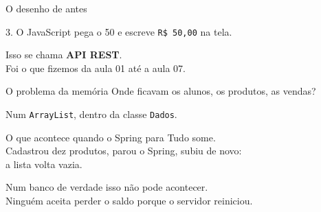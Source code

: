 \documentclass[aspectratio=169,11pt]{beamer}
\begin{document}
\begin{frame}{O desenho de antes}
  \begin{center}
  \end{center}

  \vspace{0.6em}
  3. O JavaScript pega o 50 e escreve \texttt{R\$ 50,00} na tela.

  \vspace{0.6em}
  Isso se chama \textbf{API REST}.\\
  Foi o que fizemos da aula 01 até a aula 07.
\end{frame}

\begin{frame}{O problema da memória}
  Onde ficavam os alunos, os produtos, as vendas?

  \vspace{0.5em}
  Num \texttt{ArrayList}, dentro da classe \texttt{Dados}.

  \vspace{0.5em}
  \begin{alertblock}{O que acontece quando o Spring para}
    Tudo some.\\
    Cadastrou dez produtos, parou o Spring, subiu de novo:\\
    a lista volta vazia.
  \end{alertblock}

  \vspace{0.5em}
  Num banco de verdade isso não pode acontecer.\\
  Ninguém aceita perder o saldo porque o servidor reiniciou.
\end{frame}
\end{document}
